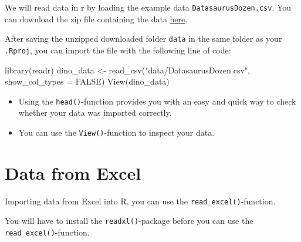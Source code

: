 \documentclass[
  letterpaper,
  DIV=11,
  numbers=noendperiod]{scrreprt}
\newenvironment{Shaded}{\begin{snugshade}}{\end{snugshade}}
\newcommand{\AttributeTok}[1]{\textcolor[rgb]{0.40,0.45,0.13}{#1}}
\newcommand{\ConstantTok}[1]{\textcolor[rgb]{0.56,0.35,0.01}{#1}}
\newcommand{\FunctionTok}[1]{\textcolor[rgb]{0.28,0.35,0.67}{#1}}
\newcommand{\NormalTok}[1]{\textcolor[rgb]{0.00,0.23,0.31}{#1}}
\newcommand{\OtherTok}[1]{\textcolor[rgb]{0.00,0.23,0.31}{#1}}
\newcommand{\StringTok}[1]{\textcolor[rgb]{0.13,0.47,0.30}{#1}}
\providecommand{\tightlist}{%
  \setlength{\itemsep}{0pt}\setlength{\parskip}{0pt}}\usepackage{longtable,booktabs,array}
\begin{document}
We will read data in r by loading the example data
\texttt{DatasaurusDozen.csv}. You can download the zip file containing
the data \href{./downloadable_files/data.zip}{here}.

After saving the unzipped downloaded folder \texttt{data} in the same
folder as your \texttt{.Rproj}, you can import the file with the
following line of code:

\begin{Shaded}
\begin{Highlighting}[]
\FunctionTok{library}\NormalTok{(readr)}
\NormalTok{dino\_data }\OtherTok{\textless{}{-}} \FunctionTok{read\_csv}\NormalTok{(}\StringTok{"data/DatasaurusDozen.csv"}\NormalTok{, }\AttributeTok{show\_col\_types =} \ConstantTok{FALSE}\NormalTok{)}
\FunctionTok{View}\NormalTok{(dino\_data)}
\end{Highlighting}
\end{Shaded}

\begin{tcolorbox}[enhanced jigsaw, opacityback=0, left=2mm, colback=white, breakable, toprule=.15mm, colframe=quarto-callout-tip-color-frame, leftrule=.75mm, arc=.35mm, rightrule=.15mm, bottomrule=.15mm]
\begin{minipage}[t]{5.5mm}
\textcolor{quarto-callout-tip-color}{\faLightbulb}
\end{minipage}%
\begin{minipage}[t]{\textwidth - 5.5mm}

\begin{itemize}
\tightlist
\item
  Using the \texttt{head()}-function provides you with an easy and quick
  way to check whether your data was imported correctly.
\item
  You can use the \texttt{View()}-function to inspect your data.
\end{itemize}

\end{minipage}%
\end{tcolorbox}

\hypertarget{data-from-excel}{%
\section{Data from Excel}\label{data-from-excel}}

Importing data from Excel into R, you can use the
\texttt{read\_excel()}-function.

\begin{tcolorbox}[enhanced jigsaw, opacityback=0, left=2mm, colback=white, breakable, toprule=.15mm, colframe=quarto-callout-important-color-frame, leftrule=.75mm, arc=.35mm, rightrule=.15mm, bottomrule=.15mm]
\begin{minipage}[t]{5.5mm}
\textcolor{quarto-callout-important-color}{\faExclamation}
\end{minipage}%
\begin{minipage}[t]{\textwidth - 5.5mm}

You will have to install the \texttt{readxl()}-package before you can
use the \texttt{read\_excel()}-function.

\end{minipage}%
\end{tcolorbox}
\end{document}
